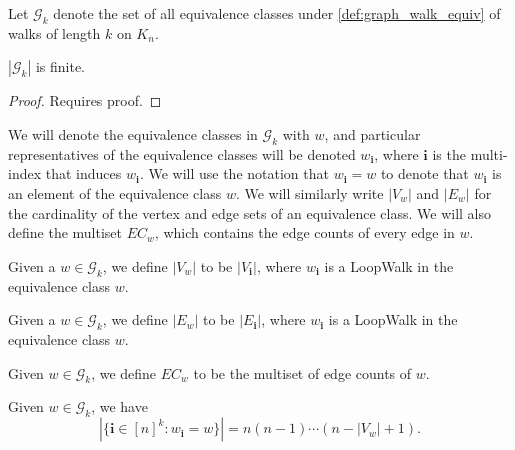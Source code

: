 \begin{definition}
  \label{def:g_k}
  Let $\mathcal{G}_k$ denote the set of all equivalence classes under \ref{def:graph_walk_equiv}
  of walks of length $k$ on $K_n$.
\end{definition}

\begin{lemma}
  \label{lem:graph_set_finite}
  $|\mathcal{G}_k|$ is finite.
\end{lemma}

\begin{proof}
  Requires proof.
\end{proof}


We will denote the equivalence classes in $\mathcal{G}_k$ with $w$, and particular representatives
of the equivalence classes will be denoted $w_{\mathbf{i}}$, where $\mathbf{i}$ is the multi-index
that induces $w_\mathbf{i}$. We will use the notation that $w_{\mathbf{i}} = w$ to denote that
$w_{\mathbf{i}}$ is an element of the equivalence class $w$. We will similarly write $|V_w|$ and
$|E_w|$ for the cardinality of the vertex and edge sets of an equivalence class. We will also define
the multiset $EC_w$, which contains the edge counts of every edge in $w$.


\begin{definition}[$|V_w|$ : ef:abs.V\_w]
  \label{def:abs.V_w}
  Given a  $w \in \mathcal{G}_k$, we define $|V_w|$ to be $|V_{\mathbf{i}}|$, where $w_{\mathbf{i}}$
  is a LoopWalk in the equivalence class $w$.
\end{definition}

\begin{definition}
  \label{def:abs.E_w}
  Given a  $w \in \mathcal{G}_k$, we define $|E_w|$ to be $|E_{\mathbf{i}}|$, where $w_{\mathbf{i}}$
  is a LoopWalk in the equivalence class $w$.
\end{definition}

\begin{definition}
  \label{def:edge_count_w}
  Given $w \in \mathcal{G}_k$, we define $EC_w$ to be the multiset of edge counts of $w$.
\end{definition}


\begin{lemma}
  \label{lem:lem_4.3}
  Given $w \in \mathcal{G}_k$, we have
  \[
   |\{ \mathbf{i} \in [n]^k : w_\mathbf{i} = w \}| = n (n-1) \cdots (n - |V_w| + 1).
  \]
\end{lemma}


